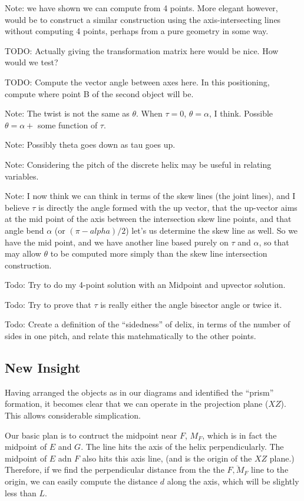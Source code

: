 \documentclass[11pt]{article}
\begin{document}
Note: we have shown we can compute from 4 points.
More elegant however, would be to construct a similar
construction using the axis-intersecting lines without
computing 4 points, perhaps from a pure geometry in some way.

TODO: Actually giving the transformation matrix here would be nice.
How would we test? 

TODO: Compute the vector angle between axes here. In this positioning, compute where
point B of the second object will be.

Note: The twist is not the same as $\theta$. When $\tau = 0$, $\theta = \alpha$,
I think. Possible $\theta = \alpha + $ some function of $\tau$.

Note: Possibly theta goes down as tau goes up.

Note: Considering the pitch of the discrete helix may be useful
in relating variables.

Note: I now think we can think in terms of the skew lines (the
joint lines), and I believe $\tau$ is directly the angle
formed with the up vector, that the up-vector aims at
the mid point of the axis between the intersection skew line
points, and that angle bend $\alpha$ (or $(\pi - alpha)/2$)
let's us determine the skew line as well.  So we have
the mid point, and we have another line based purely
on $\tau$ and $\alpha$, so that may allow $\theta$
to be computed more simply than the skew line intersection
construction.

Todo: Try to do my 4-point solution with an Midpoint and
upvector solution.

Todo: Try to prove that $\tau$ is really either the
angle bisector angle or twice it.

Todo: Create a definition of the ``sidedness'' of delix,
in terms of the number of sides in one pitch, and relate
this matehmatically to the other points.

\subsection{New Insight}

Having arranged the objects as in our diagrams and identified the ``prism'' formation,
it becomes clear that we can operate in the projection plane ($XZ$).
This allows considerable simplication.

Our basic plan is to contruct the midpoint near $F$, $M_F$, which is
in fact the midpoint of $E$ and $G$. The line hits the axis
of the helix perpendicularly. The midpoint of $E$ adn $F$ also
hits this axis line, (and is the origin of the $XZ$ plane.)
Therefore, if we find the perpendicular distance from the the $\overline{F,M_F}$
line to the origin, we can easily compute the distance $d$ along the axis,
which will be slightly less than $L$. 
\end{document}
